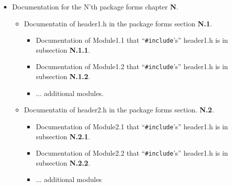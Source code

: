 \documentclass[oneside]{book}
\begin{document}
\begin{itemize}
    \vspace*{-0.1in}
    \item Documentation for the N'th package forms chapter {\large \bf N}. 
    \vspace*{-0.051in}
    \begin{itemize} 
        \vspace*{-0.051in}
        \item Documentatin of header1.h in the package forms section
             {\large \bf N.1}.
             \begin{itemize} 
                 \vspace*{-0.051in}
                 \item Documentation of Module1.1 that 
                       ``{\texttt {\#include}}'s'' header1.h
                       is in subsection {\large \bf N.1.1}.
                 \vspace*{-0.051in}
                 \item Documentation of Module1.2 that 
                       ``{\texttt {\#include}}'s'' header1.h
                       is in subsection {\large \bf N.1.2}.
                 \vspace*{-0.051in}
                 \item ... additional modules.
             \end{itemize} 
        \vspace*{-0.051in}
        \item Documentatin of header2.h in the package forms section.
             {\large \bf N.2}.
             \begin{itemize} 
                 \vspace*{-0.051in}
                 \item Documentation of Module2.1 that 
                       ``{\texttt {\#include}}'s'' header1.h
                       is in subsection {\large \bf N.2.1}.
                 \vspace*{-0.051in}
                 \item Documentation of Module2.2 that 
                       ``{\texttt {\#include}}'s'' header1.h
                       is in subsection {\large \bf N.2.2}.
                 \vspace*{-0.051in}
                 \item ... additional modules
             \end{itemize} 
        \vspace*{-0.051in}

\end{itemize}
\end{itemize}
\end{document}

